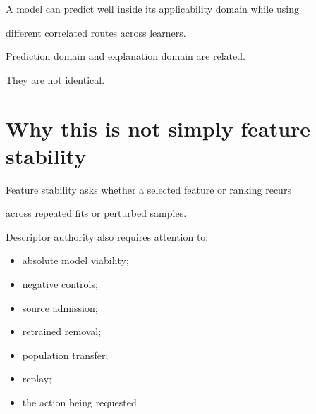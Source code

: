 \documentclass[11pt,a4paper,oneside]{report}
\begin{document}
A model can predict well inside its applicability domain while using

different correlated routes across learners.



Prediction domain and explanation domain are related.



They are not identical.





\section{Why this is not simply feature stability}



Feature stability asks whether a selected feature or ranking recurs

across repeated fits or perturbed samples.



Descriptor authority also requires attention to:



\begin{itemize}



\item

absolute model viability;



\item

negative controls;



\item

source admission;



\item

retrained removal;



\item

population transfer;



\item

replay;



\item

the action being requested.



\end{itemize}
\end{document}
